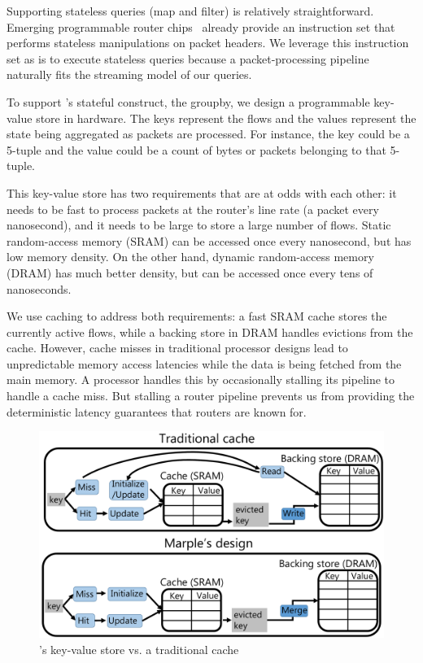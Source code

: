 Supporting stateless queries ({\ct map} and {\ct filter}) is relatively
straightforward. Emerging programmable router chips~\cite{rmt, xpliant,
flexpipe, tofino} already provide an instruction set that performs stateless
manipulations on packet headers. We leverage this instruction set as is to
execute stateless queries because a packet-processing pipeline naturally fits
the streaming model of our queries.

To support \TheSystem's stateful construct, the {\ct groupby}, we design a
programmable key-value store in hardware. The keys represent the flows and the
values represent the state being aggregated as packets are processed. For
instance, the key could be a 5-tuple and the value could be a count of bytes or
packets belonging to that 5-tuple.

This key-value store has two requirements that are at odds with each other: it
needs to be fast to process packets at the router's line rate (a packet every
nanosecond), and it needs to be large to store a large number of flows. Static
random-access memory (SRAM) can be accessed once every nanosecond, but has low
memory density. On the other hand, dynamic random-access memory (DRAM) has much
better density, but can be accessed once every tens of nanoseconds.

We use caching to address both requirements: a fast SRAM cache stores the
currently active flows, while a backing store in DRAM handles evictions from
the cache. However, cache misses in traditional processor designs lead to
unpredictable memory access latencies while the data is being fetched from the
main memory. A processor handles this by occasionally stalling its pipeline to
handle a cache miss. But stalling a router pipeline prevents us from providing
the deterministic latency guarantees that routers are known for.

\begin{figure}
\centering
\includegraphics[width=0.6\columnwidth]{pq_kv_store.pdf}
\caption{\TheSystem's key-value store vs. a traditional cache}
\label{fig:hw_diff}
\end{figure}

